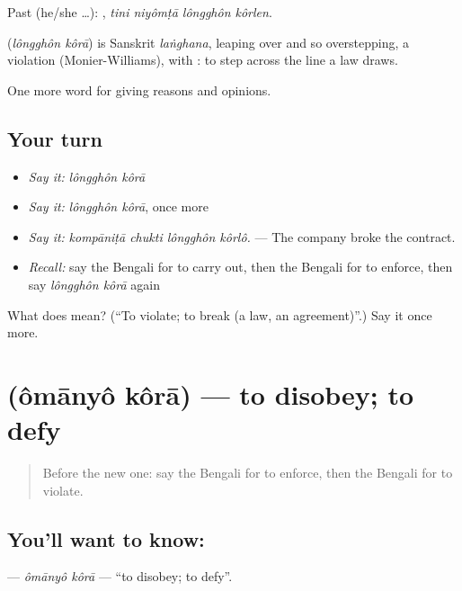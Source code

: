 Past (he/she …):    , \emph{tini niyômṭā lôngghôn kôrlen}.

\begin{cousinweb}
\textbf{ } (\emph{lôngghôn kôrā}) is Sanskrit \emph{laṅghana}, leaping over and so overstepping, a violation (Monier-Williams), with : to step across the line a law draws.
\end{cousinweb}

\begin{grammarlens}[title={What you've built}]
One more word for giving reasons and opinions.
\end{grammarlens}

\subsection*{Your turn}
\begin{itemize}
\raggedright
  \item \emph{Say it:} \emph{lôngghôn kôrā}
  \item \emph{Say it:} \emph{lôngghôn kôrā}, once more
  \item \emph{Say it:} \emph{kompāniṭā chukti lôngghôn kôrlô.} — The company broke the contract.
  \item \emph{Recall:} say the Bengali for to carry out, then the Bengali for to enforce, then say \emph{lôngghôn kôrā} again
\end{itemize}

\begin{tcolorbox}[breakable,colback=teal!4,colframe=teal!35!black,title={Before you move on}]
What does   mean? (\textquotedblleft{}To violate; to break (a law, an agreement)\textquotedblright{}.) Say it once more.
\end{tcolorbox}
\section[\texorpdfstring{\bn{অমান্য} \bn{করা} (ômānyô kôrā)}{অমান্য করা (ômānyô kôrā)}]{  (ômānyô kôrā) — to disobey; to defy}

\label{lesson:BN-C341-omanyo-kora}



\begin{quote}
Before the new one: say the Bengali for to enforce, then the Bengali for to violate.
\end{quote}

\subsection*{You'll want to know:  }
\textbf{ } — \emph{ômānyô kôrā} — \textquotedblleft{}to disobey; to defy\textquotedblright{}.


